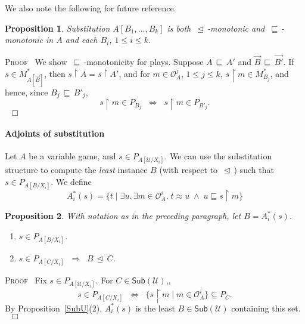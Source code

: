\documentclass[a4paper,11pt]{article}
\newcommand{\gequiv}{\approx}
\newcommand{\UU}{\mathcal{U}}
\newtheorem{proposition}{Proposition}[section]
\newcommand{\restrict}{{\upharpoonright}}
\newcommand{\domapprox}{\, \sqsubseteq \,}
\newcommand{\ginc}{\, \trianglelefteq \,}
\newcommand{\Occ}{\mathcal{O}}
\newcommand{\SubU}{\mathsf{Sub}(\UU )}
\newenvironment{proof}{\textsc{Proof}\ }{$\;\; \Box$}
\begin{document}
We also note the following for future reference.
\begin{proposition}
\label{submon}
Substitution $A[B_1 , \ldots , B_k ]$ is both $\ginc$-monotonic and $\domapprox$-monotonic in $A$ and each $B_i$, $1 \leq i \leq k$.
\end{proposition}
\begin{proof}
We show $\domapprox$-monotonicity for plays. Suppose $A \domapprox A'$ and $\vec{B} \domapprox \vec{B'}$. If $s \in M^{\ast}_{A[\vec{B}]}$, then $s \restrict A = s \restrict A'$, and for $m \in \Occ_A^j$, $1 \leq j \leq k$, $s \restrict m \in M_{B_j}^{\ast}$, and hence, since $B_j \domapprox B'_j$,
\[ s \restrict m \in P_{B_j} \;\; \Longleftrightarrow \;\; s \restrict m \in P_{B'_j} . \]
\end{proof}

\paragraph{Adjoints of substitution}
Let $A$ be a variable game, and $s \in P_{A[\UU/X_{i}]}$.  We can use the
substitution structure to compute the \emph{least} instance $B$ (with
respect to $\ginc$)  such
that $s \in P_{A[B/X_{i}]}$. We define
\[ A_{i}^{\ast}(s) = \{ t \mid \exists u. \, \exists  m \in \Occ_A^i . \; t \gequiv u
\; \wedge \; u \sqsubseteq s \restrict m \} \]

\begin{proposition}
\label{inv}
With notation as in the preceding paragraph, let $B = A_{i}^{\ast}(s)$.
\begin{enumerate}
\item $s \in P_{A[B/X_{i}]}$.
\item $s \in P_{A[C/X_{i}]} \;\; \Longrightarrow \;\; B \ginc C$.
\end{enumerate}
\end{proposition}
\begin{proof}
Fix $s \in P_{A[\UU/X_{i}]}$. For $C \in \SubU$,,
\[ s \in P_{A[C/X_{i}]} \;\; \Longleftrightarrow \;\; \{ s \restrict m
\mid m \in \Occ_A^i \} \subseteq P_C . \]
By Proposition~\ref{SubU}(2), $A_{i}^{\ast}(s)$ is the least $B \in
\SubU$ containing this set.
\end{proof}
\end{document}
